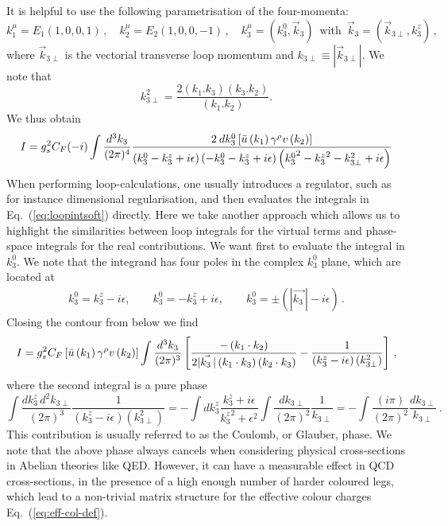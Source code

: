 It is helpful to use the following parametrisation of the four-momenta:
\begin{equation}
k_1^{\mu}=E_1\left(1,0,0,1\right)\,,\quad k_2^{\mu}=E_2\left(1,0,0,-1\right)\,,\quad k_3^{\mu}=\left(k_{3}^0,\vec{k}_3\right)\,\textrm{ with }\, \vec{k}_3=\left(\vec{k}_{3\perp},k_{3}^z\right)\,,
\end{equation}
where $\vec{k}_{3 \perp}$ is the vectorial transverse loop momentum and $k_{3\perp} \equiv | \vec{k}_{3\perp} |$.
%
We note that
\begin{equation}\label{eq:dipole-kperp}
  k_{3\perp}^2=\frac{2(k_1.k_3)(k_3.k_2)}{(k_1.k_2)}.
\end{equation}
% 
We thus obtain
\begin{equation}\label{eq:loopintsoft}
I=g_s^{2} C_{F}(-i)\int\frac{d^{3}k_3}{(2\pi)^{4}}\frac{2\:d k_3^0 \left[\bar{u}\left(k_1\right)\gamma^{\rho}v\left(k_2\right)\right]}{\left(k_3^0-k_3^z+i\epsilon\right)\left(-k_3^0-k_3^z+i\epsilon\right)\left({k_3^0}^{2}-{k_3^z}^{2}-k_{3 \perp}^{2}+i\epsilon\right)}
\end{equation}
When performing loop-calculations, one usually introduces a regulator,
such as for instance dimensional regularisation, and then evaluates
the integrals in Eq.~(\ref{eq:loopintsoft}) directly. Here we take
another approach which allows us to highlight the similarities between loop integrals for the
  virtual terms and phase-space integrals for the real
  contributions. We want first to evaluate the integral in
$k_3^0$. We note that the integrand has four poles in the complex
$k_3^0$ plane, which are located at 
\begin{eqnarray}
k_3^0=k_3^z-i\epsilon,\qquad k_3^0=-k_3^z+i\epsilon, \qquad k_3^0=\pm\left(|\vec{k_3\,}|-i\epsilon\right)\,.
\end{eqnarray}
Closing the contour from below we find
\begin{equation}\label{eq:virtual-antenna+glauber}
I=g_s^{2} C_{F}\left[\bar{u}\left(k_1\right)\gamma^{\rho}v\left(k_2\right)\right]\int\frac{d^{3}k_3}{(2\pi)^{3}}\left[\frac{-\left(k_1\cdot k_2\right)}{2|\vec{k_3\,}|\left(k_1\cdot k_3\right)\left(k_2\cdot k_3\right)}-\frac{1}{\left(k_3^z-i\epsilon\right)\left(k_{3\perp}^{2}\right)}\right]\,,
\end{equation}
where the second integral is a pure phase
\begin{equation}
\int\frac{d k_3^z\, d^2 k_{3\perp}}{\left(2\pi\right)^{3}}\frac{1}{\left(k_3^z-i\epsilon\right)\left(k_{3\perp}^2 \right)}=-\int d k_3^z\frac{k_3^z+i\epsilon}{{k_3^z}^{2}+\epsilon^{2}}\int\frac{d k_{3\perp}}{\left(2\pi\right)^{2}}\frac{1}{k_{3\perp}}=-\int\frac{\left(i\pi\right)}{\left(2\pi\right)^{2}}\frac{d k_{3\perp}}{k_{3\perp}}\,.
\end{equation}
This contribution is usually referred to as the Coulomb, or Glauber,
phase. We note that the above phase always cancels when considering
physical cross-sections in Abelian theories like QED. However, it can
have a measurable effect in QCD cross-sections, in the presence of a
high enough number of harder coloured legs, which lead to a
non-trivial matrix structure for the effective colour charges
Eq.~(\ref{eq:eff-col-def}).


